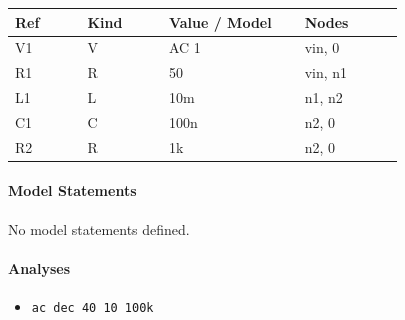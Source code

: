 \begin{longtable}{p{0.16\linewidth}p{0.18\linewidth}p{0.30\linewidth}p{0.22\linewidth}}
\textbf{Ref} & \textbf{Kind} & \textbf{Value / Model} & \textbf{Nodes}\\
\hline
V1 & V & AC 1 & vin, 0\\
R1 & R & 50 & vin, n1\\
L1 & L & 10m & n1, n2\\
C1 & C & 100n & n2, 0\\
R2 & R & 1k & n2, 0\\
\end{longtable}

\paragraph{Model Statements}
No model statements defined.

\paragraph{Analyses}
\begin{itemize}
  \item \texttt{ac dec 40 10 100k}
\end{itemize}

